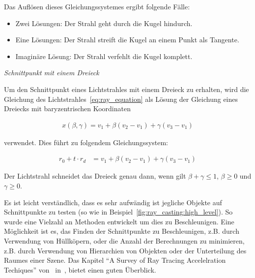 Das Auflösen dieses Gleichungssystemes ergibt folgende Fälle:

\begin{itemize}
    \item{Zwei Lösungen}: Der Strahl geht durch die Kugel hindurch.
    \item{Eine Lösungen}: Der Strahl streift die Kugel an einem Punkt
        als Tangente.
    \item{Imaginäre Lösung}: Der Strahl verfehlt die Kugel komplett.
\end{itemize}


\textit{Schnittpunkt mit einem Dreieck}

Um den Schnittpunkt eines Lichtstrahles mit einem Dreieck zu erhalten,
wird die Gleichung des Lichtstrahles~\ref{eq:ray_equation} als Lösung
der Gleichung eines Dreiecks mit baryzentrischen Koordinaten

\begin{gather}
    x(\beta, \gamma) = v_{1} + \beta(v_{2} - v_{1}) + \gamma(v_{3} - v_{1})
\end{gather}

verwendet. Dies führt zu folgendem Gleichungssystem:

\begin{align}
    r_{0} + t \cdot r_{d} &= v_{1} + \beta(v_{2} - v_{1}) + \gamma(v_{3} - v_{1})
\end{align}

Der Lichtstrahl schneidet das Dreieck genau dann, wenn gilt $\beta +
\gamma \le 1$, $\beta \ge 0$ und $\gamma \ge 0$.

Es ist leicht verständlich, dass es sehr aufwändig ist jegliche Objekte
auf Schnittpunkte zu testen (so wie in
Beispiel~\ref{fig:ray_casting:high_level}). So wurde eine Vielzahl an
Methoden entwickelt um dies zu Beschleunigen. Eine Möglichkeit ist es,
das Finden der Schnittpunkte zu Beschleunigen, z.B. durch Verwendung von
Hüllköpern, oder die Anzahl der Berechnungen zu minimieren, z.B. durch
Verwendung von Hierarchien von Objekten oder der Unterteilung des Raumes
einer Szene. Das Kapitel ``A Survey of Ray Tracing Accelelration
Techiques'' von~\citeauthor{glassner_introduction_1989} in~, bietet einen guten Überblick.

